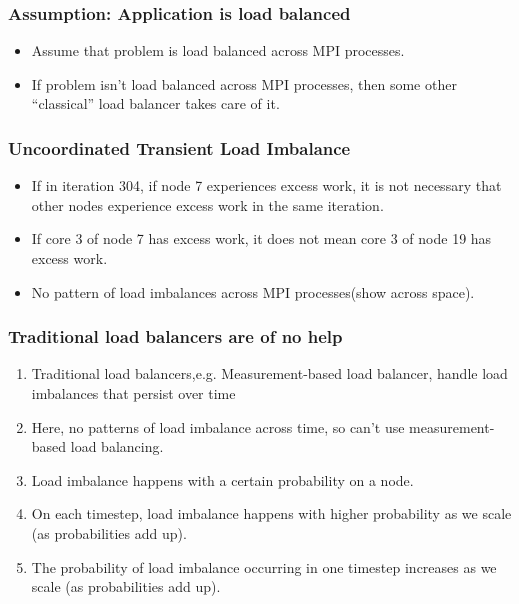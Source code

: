 {\begin{frame}
\frametitle{Assumption: Application is load balanced }
\begin{itemize}
\item \small Assume that problem is load balanced across MPI processes.
\item \small If problem isn't load balanced across MPI processes, then some other ``classical'' load balancer takes care of it.
\end{itemize}
\end{frame}



\begin{frame}
\frametitle{Uncoordinated Transient Load Imbalance}
\begin{itemize}
\item \small If in iteration 304, if node 7 experiences excess work, it is not necessary that other nodes experience excess work in the same iteration.
\item \small If core 3 of node 7 has excess work, it does not mean core 3 of node 19 has excess work.
\item \small No pattern of load imbalances across MPI processes(show across space).
\end{itemize}
\end{frame}

\begin{frame}
\frametitle{Traditional load balancers are of no help }
\begin{enumerate}
\item \small Traditional load balancers,e.g. Measurement-based load balancer, handle load imbalances that persist over time
\item \small Here, no patterns of load imbalance across time, so can't use measurement-based load balancing.
\item \small Load imbalance happens with a certain probability on a node.
\item \small On each timestep, load imbalance happens with higher probability as we scale (as probabilities add up).
\item \small The probability of load imbalance occurring in one timestep increases as we scale (as probabilities add up).
\end{enumerate}
\end{frame}

}
